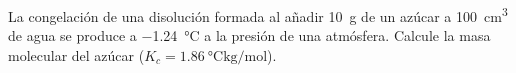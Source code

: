 La congelación de una disolución formada al añadir \SI{10}{\gram} de un azúcar a \SI{100}{\cubic\centi\meter} de agua se produce a \SI{-1,24}{\celsius} a la presión de una atmósfera. Calcule la masa molecular del azúcar ($K_c = \SI{1,86}{\celsius\kilogram\per\mol}$).
